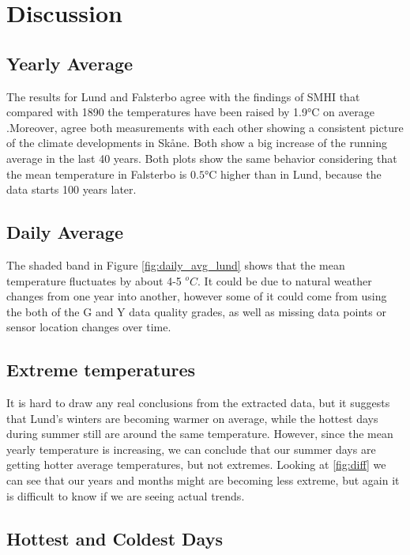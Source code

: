 \documentclass[12pt]{article}
\numberwithin{equation}{section}
\begin{document}
\section{Discussion}

\subsection{Yearly Average}
The results for Lund and Falsterbo agree with the findings of SMHI that compared with 1890 the temperatures have been raised by 1.9°C on average \cite{SMHI_1}.Moreover, agree both measurements with each other showing a consistent picture of the climate developments in Skåne. Both show a big increase of the running average in the last 40 years. Both plots show the same behavior considering that the mean temperature in Falsterbo is $0.5$°C higher than in Lund, because the data starts 100 years later.


\subsection{Daily Average}

The shaded band in Figure \ref{fig:daily_avg_lund} shows that the mean temperature fluctuates by about 4-5 $^oC$. It could be due to natural weather changes from one year into another, however some of it could come from using the both of the G and Y data quality grades, as well as missing data points or sensor location changes over time.


\subsection{Extreme temperatures}

It is hard to draw any real conclusions from the extracted data, but it suggests that Lund's winters are becoming warmer on average, while the hottest days during summer still are around the same temperature. However, since the mean yearly temperature is increasing, we can conclude that our summer days are getting hotter average temperatures, but not extremes. Looking at \autoref{fig:diff} we can see that our years and months might are becoming less extreme, but again it is difficult to know if we are seeing actual trends.

\subsection{Hottest and Coldest Days}
\end{document}
